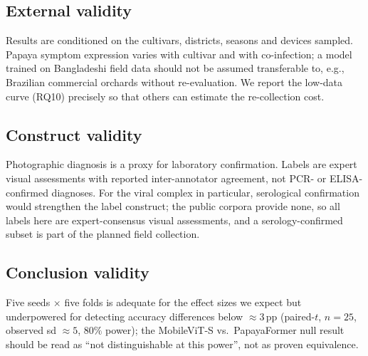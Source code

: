 \documentclass[10pt,twocolumn,a4paper]{article}
\begin{document}
\subsection{External validity}
Results are conditioned on the cultivars, districts, seasons and devices sampled. Papaya symptom expression varies with cultivar and with co-infection; a model trained on Bangladeshi field data should not be assumed transferable to, e.g., Brazilian commercial orchards without re-evaluation. We report the low-data curve (RQ10) precisely so that others can estimate the re-collection cost.

\subsection{Construct validity}
Photographic diagnosis is a proxy for laboratory confirmation. Labels are expert visual assessments with reported inter-annotator agreement, not PCR- or ELISA-confirmed diagnoses. For the viral complex in particular, serological confirmation would strengthen the label construct; the public corpora provide none, so all labels here are expert-consensus visual assessments, and a serology-confirmed subset is part of the planned field collection.

\subsection{Conclusion validity}
Five seeds $\times$ five folds is adequate for the effect sizes we expect but underpowered for detecting accuracy differences below $\approx3$\,pp (paired-$t$, $n=25$, observed sd $\approx5$, $80\%$ power); the MobileViT-S vs.\ PapayaFormer null result should be read as ``not distinguishable at this power'', not as proven equivalence.
\end{document}
